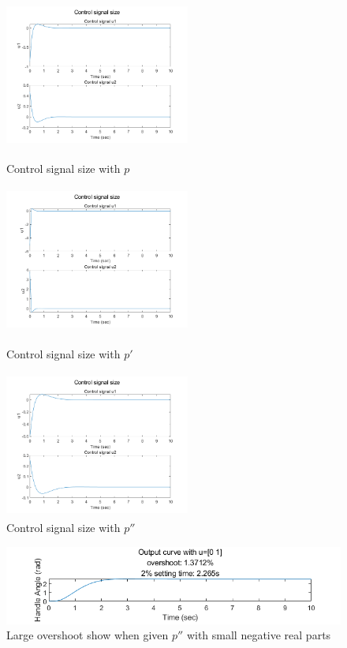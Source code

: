 \documentclass[hyperref]{article}
\theoremstyle{nonumberplain}
\begin{document}
	\begin{figure}[htbp] %
		\begin{minipage}[t]{0.33\linewidth} %
			\centering
			\includegraphics[width=2.4in, height=1.9in]{fig8.png} %
			\caption{Control signal size with $p$} %
			\label{fig6}
		\end{minipage}%
		\begin{minipage}[t]{0.33\linewidth}
			\centering
			\includegraphics[width=2.4in, height=1.9in]{fig9.png}
			\caption{Control signal size with ${p}'$}
			\label{fig7}
		\end{minipage}%
		\begin{minipage}[t]{0.33\linewidth}
			\centering
			\includegraphics[width=2.4in, height=1.9in]{fig10.png}
			\caption{Control signal size with ${p}''$}
			\label{fig8}
		\end{minipage}
	\end{figure}

	\begin{figure}[htbp]
		\centering
		\includegraphics[width=0.6\linewidth]{fig11.png}
		\caption{Large overshoot show when given ${p}''$ with small negative real parts}
		\label{fig9}
	\end{figure}
	
\end{document}
